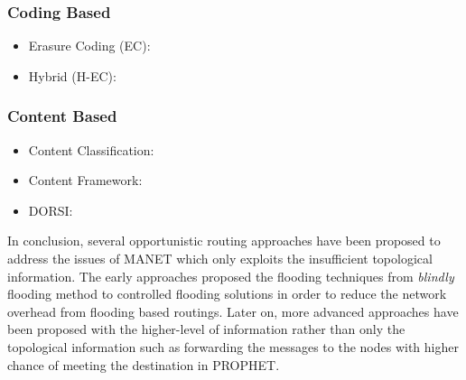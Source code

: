 \subsubsection{Coding Based }
\label{bg:Opportunistic Networks:Classification of Opportunistic Routing:CB}
	\begin{itemize}
		\item Erasure Coding (EC):

		\item Hybrid (H-EC):
	\end{itemize}



\subsubsection{Content Based }
\label{bg:Opportunistic Networks:Classification of Opportunistic Routing:CTB}
	\begin{itemize}
		\item Content Classification:
		\item Content Framework:
		\item DORSI:
	\end{itemize}

In conclusion, several opportunistic routing approaches have been proposed to address the issues of MANET which only exploits the insufficient topological information.
The early approaches proposed the flooding techniques from \emph{blindly} flooding method to controlled flooding solutions in order to reduce the network overhead from flooding based routings.
Later on, more advanced approaches have been proposed with the higher-level of information rather than only the topological information such as forwarding the messages to the nodes with higher chance of meeting the destination in PROPHET.



